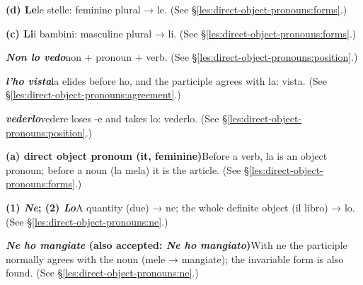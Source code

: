 \documentclass[11pt,a4paper,twoside,openright]{book}
\newcommand{\answerheading}[1]{\par\medskip\noindent{\sffamily\bfseries\small #1}\par\nopagebreak}
\begin{document}
\answerheading{\S\ref{les:direct-object-pronouns} Direct object pronouns}\label{ans:direct-object-pronouns}
\begin{answers}
\item\relax \textbf{(d) Le}\newline le stelle: feminine plural → le. {\color{muted}(See \S\ref{les:direct-object-pronouns:forms}.)}
\item\relax \textbf{(c) Li}\newline i bambini: masculine plural → li. {\color{muted}(See \S\ref{les:direct-object-pronouns:forms}.)}
\item\relax \textbf{\textit{Non lo vedo}}\newline non + pronoun + verb. {\color{muted}(See \S\ref{les:direct-object-pronouns:position}.)}
\item\relax \textbf{\textit{l'ho vista}}\newline la elides before ho, and the participle agrees with la: vista. {\color{muted}(See \S\ref{les:direct-object-pronouns:agreement}.)}
\item\relax \textbf{\textit{vederlo}}\newline vedere loses -e and takes lo: vederlo. {\color{muted}(See \S\ref{les:direct-object-pronouns:position}.)}
\item\relax \textbf{(a) direct object pronoun (it, feminine)}\newline Before a verb, la is an object pronoun; before a noun (la mela) it is the article. {\color{muted}(See \S\ref{les:direct-object-pronouns:forms}.)}
\item\relax \textbf{(1) \textit{Ne}; (2) \textit{Lo}}\newline A quantity (due) → ne; the whole definite object (il libro) → lo. {\color{muted}(See \S\ref{les:direct-object-pronouns:ne}.)}
\item\relax \textbf{\textit{Ne ho mangiate} {\color{muted}(also accepted: \textit{Ne ho mangiato})}}\newline With ne the participle normally agrees with the noun (mele → mangiate); the invariable form is also found. {\color{muted}(See \S\ref{les:direct-object-pronouns:ne}.)}
\end{answers}
\end{document}

